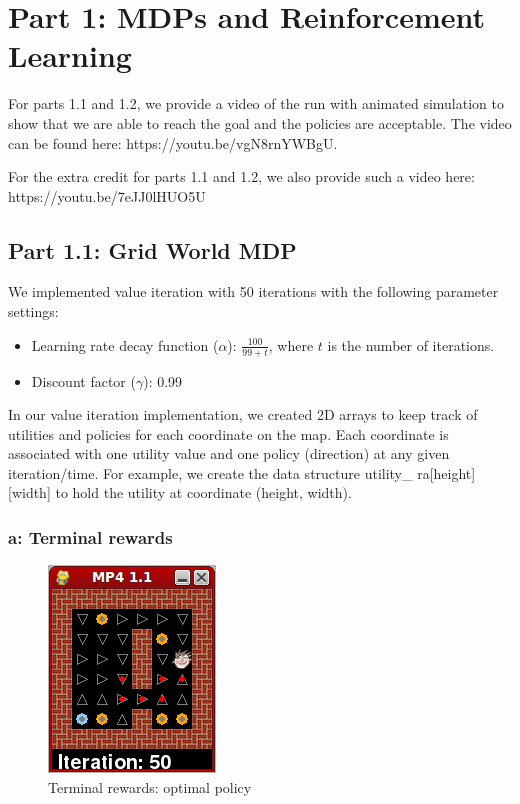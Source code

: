 \section{Part 1: MDPs and Reinforcement Learning}
For parts 1.1 and 1.2, we provide a video of the run with animated simulation to show that we are able to reach the goal and the policies are acceptable. The video can be found here: https://youtu.be/vgN8rnYWBgU.

For the extra credit for parts 1.1 and 1.2, we also provide such a video here: https://youtu.be/7eJJ0lHUO5U

\subsection{Part 1.1: Grid World MDP}

We implemented value iteration with 50 iterations with the following parameter settings:
\begin{itemize}
  \item Learning rate decay function ($\alpha$): $\frac{100}{99+t}$, where $t$ is the number of iterations.
  \item Discount factor ($\gamma$): 0.99
\end{itemize}

In our value iteration implementation, we created 2D arrays to keep track of utilities and policies for each coordinate on the map. Each coordinate is associated with one utility value and one policy (direction) at any given iteration/time. For example, we create the data structure utility\_ ra[height][width] to hold the utility at coordinate (height, width).

\subsubsection{a: Terminal rewards}
\begin{figure}[H]
  \centering
  \includegraphics[width=0.2\linewidth]{graphics/term_11_opti_policy.png}
  \caption{Terminal rewards: optimal policy}
\end{figure}

